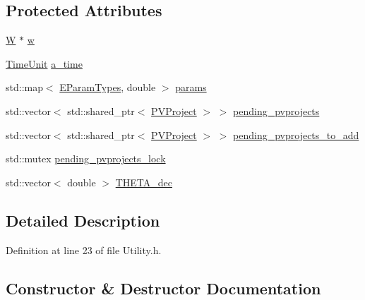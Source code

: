 \subsection*{Protected Attributes}
\begin{DoxyCompactItemize}
\item 
\hyperlink{classsolar__core_1_1_w}{W} $\ast$ \hyperlink{classsolar__core_1_1_utility_af46cb137dd05f7b0cabe2aed249498fb}{w}
\item 
\hyperlink{namespacesolar__core_a4b5949d07259da6f8a20d12a30403e90}{Time\+Unit} \hyperlink{classsolar__core_1_1_utility_acc68b5e07894b8c3918a7512391c6f7e}{a\+\_\+time}
\item 
std\+::map$<$ \hyperlink{namespacesolar__core_aa1147341e5ef7a40d68d1bd68e149362}{E\+Param\+Types}, double $>$ \hyperlink{classsolar__core_1_1_utility_a9df3a727c125d50170b7c0e190de460a}{params}
\item 
std\+::vector$<$ std\+::shared\+\_\+ptr$<$ \hyperlink{classsolar__core_1_1_p_v_project}{P\+V\+Project} $>$ $>$ \hyperlink{classsolar__core_1_1_utility_a80f37d5cc4772161923aaacb73e45e81}{pending\+\_\+pvprojects}
\item 
std\+::vector$<$ std\+::shared\+\_\+ptr$<$ \hyperlink{classsolar__core_1_1_p_v_project}{P\+V\+Project} $>$ $>$ \hyperlink{classsolar__core_1_1_utility_ae3b66140590b19d4c448aa8f8f559906}{pending\+\_\+pvprojects\+\_\+to\+\_\+add}
\item 
std\+::mutex \hyperlink{classsolar__core_1_1_utility_a7100cb063e2dbdf0f5ac2cff9cf3d030}{pending\+\_\+pvprojects\+\_\+lock}
\item 
std\+::vector$<$ double $>$ \hyperlink{classsolar__core_1_1_utility_a32f7a95da732c6e48c15804277886a45}{T\+H\+E\+T\+A\+\_\+dec}
\end{DoxyCompactItemize}


\subsection{Detailed Description}


Definition at line 23 of file Utility.\+h.



\subsection{Constructor \& Destructor Documentation}
\hypertarget{classsolar__core_1_1_utility_aa52a4877b6281d4ffa8f003b831e802c}{}
